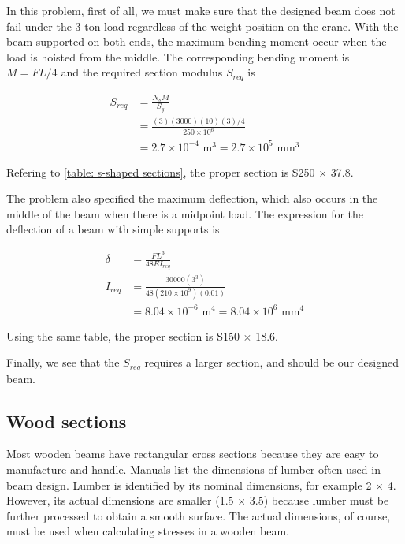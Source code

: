 \documentclass[
10pt,
a4paper,
openany,
svgnames,
]{book}
\begin{document}
\begin{solution}
  In this problem, first of all, we must make sure that the designed beam does not fail under the 3-ton load regardless of the weight position on the crane. With the beam supported on both ends, the maximum bending moment occur when the load is hoisted from the middle. The corresponding bending moment is $M = FL / 4$ and the required section modulus $S_{req}$ is

  \begin{align*}
    S_{req} &= \frac{N_s M}{S_y} \\
            &= \frac{(3)(3000)(10)(3)/4}{250 \times 10^6} \\
            &= 2.7 \times 10^{-4} \text{ m}^3 = 2.7 \times 10^5 \text{ mm}^3
  \end{align*}

  Refering to \cref{table: s-shaped sections}, the proper section is S250 $\times$ 37.8.

  The problem also specified the maximum deflection, which also occurs in the middle of the beam when there is a midpoint load. The expression for the deflection of a beam with simple supports is

  \begin{align*}
    \delta &= \frac{FL^3}{48EI_{req}} \\
    I_{req} &= \frac{30000(3^3)}{48(210 \times 10^9)(0.01)} \\
           &= 8.04 \times 10^{-6} \text{ m}^4 = 8.04 \times 10^6 \text{ mm}^4
  \end{align*}

  Using the same table, the proper section is S150 $\times$ 18.6.

  Finally, we see that the $S_{req}$ requires a larger section, and should be our designed beam.
\end{solution}

\subsection{Wood sections}

Most wooden beams have rectangular cross sections because they are easy to manufacture and handle. Manuals list the dimensions of lumber often used in beam design. Lumber is identified by its nominal dimensions, for example 2 $\times$ 4. However, its actual dimensions are smaller (1.5 $\times$ 3.5) because lumber must be further processed to obtain a smooth surface. The actual dimensions, of course, must be used when calculating stresses in a wooden beam.
\end{document}

